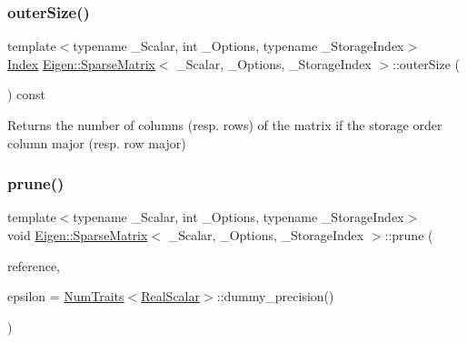 \subsubsection{\texorpdfstring{outerSize()}{outerSize()}}
{\footnotesize\ttfamily template$<$typename \+\_\+\+Scalar, int \+\_\+\+Options, typename \+\_\+\+Storage\+Index$>$ \\
\mbox{\hyperlink{struct_eigen_1_1_eigen_base_a554f30542cc2316add4b1ea0a492ff02}{Index}} \mbox{\hyperlink{class_eigen_1_1_sparse_matrix}{Eigen\+::\+Sparse\+Matrix}}$<$ \+\_\+\+Scalar, \+\_\+\+Options, \+\_\+\+Storage\+Index $>$\+::outer\+Size (\begin{DoxyParamCaption}{ }\end{DoxyParamCaption}) const\hspace{0.3cm}{\ttfamily [inline]}}

\begin{DoxyReturn}{Returns}
the number of columns (resp. rows) of the matrix if the storage order column major (resp. row major) 
\end{DoxyReturn}
\mbox{\label{class_eigen_1_1_sparse_matrix_a08af03b2fc6c371c8be4fcd62509288c}} 
\subsubsection{\texorpdfstring{prune()}{prune()}\hspace{0.1cm}{\footnotesize\ttfamily [1/2]}}
{\footnotesize\ttfamily template$<$typename \+\_\+\+Scalar, int \+\_\+\+Options, typename \+\_\+\+Storage\+Index$>$ \\
void \mbox{\hyperlink{class_eigen_1_1_sparse_matrix}{Eigen\+::\+Sparse\+Matrix}}$<$ \+\_\+\+Scalar, \+\_\+\+Options, \+\_\+\+Storage\+Index $>$\+::prune (\begin{DoxyParamCaption}\item[{const Scalar \&}]{reference,  }\item[{const \mbox{\hyperlink{class_eigen_1_1_sparse_matrix_base_aaec8ace6efb785c81d442931c3248d88}{Real\+Scalar}} \&}]{epsilon = {\ttfamily \mbox{\hyperlink{struct_eigen_1_1_num_traits}{Num\+Traits}}$<$\mbox{\hyperlink{class_eigen_1_1_sparse_matrix_base_aaec8ace6efb785c81d442931c3248d88}{Real\+Scalar}}$>$\+:\+:dummy\+\_\+precision()} }\end{DoxyParamCaption})\hspace{0.3cm}{\ttfamily [inline]}}

